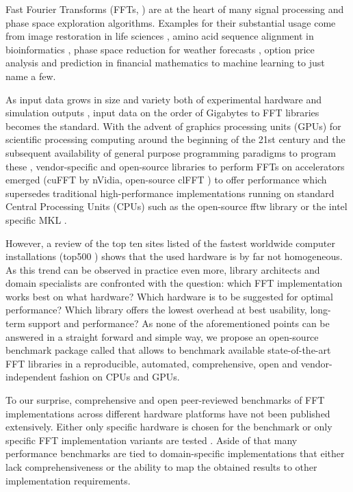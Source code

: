 Fast Fourier Transforms (FFTs, \citep{van1992computational}) are at the heart of many signal processing and phase space exploration algorithms. Examples for their substantial usage come from image restoration in life sciences \citep{preibisch2014efficient,schmid2015real}, amino acid sequence alignment in bioinformatics \citep{katoh2002mafft}, phase space reduction for weather forecasts \citep{maronga2015parallelized}, option price analysis and prediction in financial mathematics \citep{dempster2002spread,hurd2010fourier} to machine learning \citep{collobert2011torch7,jia2014caffe,abadi2016tensorflow} to just name a few.

As input data grows in size and variety both of experimental hardware \citep{huisken2004optical} and simulation outputs \citep{maronga2015parallelized}, input data on the order of Gigabytes to FFT libraries becomes the standard. With the advent of graphics processing units (GPUs) for scientific processing computing around the beginning of the 21st century and the subsequent availability of general purpose programming paradigms to program these \citep{du2012cuda}, vendor-specific and open-source libraries to perform FFTs on accelerators emerged (cuFFT \citep{nvidia2010cufft} by nVidia, open-source clFFT \citep{clfft}) to offer performance which supersedes traditional high-performance implementations running on standard Central Processing Units (CPUs) such as the open-source fftw library \citep{FFTW97,FFTW05} or the intel specific MKL \citep{intel2007intel}.

However, a review of the top ten sites listed of the fastest worldwide computer installations (top500 \citep{meuer2011top500}) shows that the used hardware is by far not homogeneous. As this trend can be observed in practice even more, library architects and domain specialists are confronted with the question: which FFT implementation works best on what hardware? Which hardware is to be suggested for optimal performance? Which library offers the lowest overhead at best usability, long-term support and performance? As none of the aforementioned points can be answered in a straight forward and simple way, we propose an open-source benchmark package called \gearshifft{} \citep{gearshifft_github} that allows to benchmark available state-of-the-art FFT libraries in a reproducible, automated, comprehensive, open and vendor-independent fashion on CPUs and GPUs.

To our surprise, comprehensive and open peer-reviewed benchmarks of FFT implementations across different hardware platforms have not been published extensively. Either only specific hardware is chosen for the benchmark \citep{park2015fast,eleftheriou2005performance} or only specific FFT implementation variants are tested \citep{shoc2010,dongarra2013hpc}. Aside of that many performance benchmarks are tied to domain-specific implementations \citep{fialka2006fft} that either lack comprehensiveness or the ability to map the obtained results to other implementation requirements.

